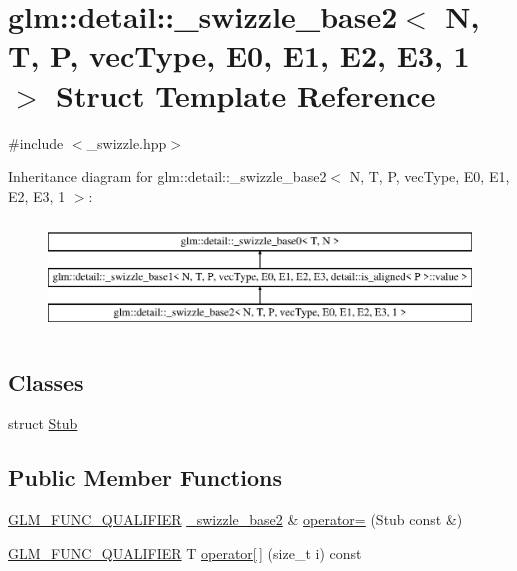 \hypertarget{structglm_1_1detail_1_1__swizzle__base2_3_01_n_00_01_t_00_01_p_00_01vec_type_00_01_e0_00_01_e1_00_01_e2_00_01_e3_00_011_01_4}{}\section{glm\+::detail\+::\+\_\+swizzle\+\_\+base2$<$ N, T, P, vec\+Type, E0, E1, E2, E3, 1 $>$ Struct Template Reference}
\label{structglm_1_1detail_1_1__swizzle__base2_3_01_n_00_01_t_00_01_p_00_01vec_type_00_01_e0_00_01_e1_00_01_e2_00_01_e3_00_011_01_4}


{\ttfamily \#include $<$\+\_\+swizzle.\+hpp$>$}

Inheritance diagram for glm\+::detail\+::\+\_\+swizzle\+\_\+base2$<$ N, T, P, vec\+Type, E0, E1, E2, E3, 1 $>$\+:\begin{figure}[H]
\begin{center}
\leavevmode
\includegraphics[height=3.000000cm]{structglm_1_1detail_1_1__swizzle__base2_3_01_n_00_01_t_00_01_p_00_01vec_type_00_01_e0_00_01_e1_00_01_e2_00_01_e3_00_011_01_4}
\end{center}
\end{figure}
\subsection*{Classes}
\begin{DoxyCompactItemize}
\item 
struct \mbox{\hyperlink{structglm_1_1detail_1_1__swizzle__base2_3_01_n_00_01_t_00_01_p_00_01vec_type_00_01_e0_00_01_e1_031fe02025030ffc83445bf43c5297f64}{Stub}}
\end{DoxyCompactItemize}
\subsection*{Public Member Functions}
\begin{DoxyCompactItemize}
\item 
\mbox{\hyperlink{setup_8hpp_a33fdea6f91c5f834105f7415e2a64407}{G\+L\+M\+\_\+\+F\+U\+N\+C\+\_\+\+Q\+U\+A\+L\+I\+F\+I\+ER}} \mbox{\hyperlink{structglm_1_1detail_1_1__swizzle__base2}{\+\_\+swizzle\+\_\+base2}} \& \mbox{\hyperlink{structglm_1_1detail_1_1__swizzle__base2_3_01_n_00_01_t_00_01_p_00_01vec_type_00_01_e0_00_01_e1_00_01_e2_00_01_e3_00_011_01_4_aefe588f8e3fc72f6be6350ba9524ae93}{operator=}} (Stub const \&)
\item 
\mbox{\hyperlink{setup_8hpp_a33fdea6f91c5f834105f7415e2a64407}{G\+L\+M\+\_\+\+F\+U\+N\+C\+\_\+\+Q\+U\+A\+L\+I\+F\+I\+ER}} T \mbox{\hyperlink{structglm_1_1detail_1_1__swizzle__base2_3_01_n_00_01_t_00_01_p_00_01vec_type_00_01_e0_00_01_e1_00_01_e2_00_01_e3_00_011_01_4_ad3ffb03de9a95ef467776571f51d40e7}{operator\mbox{[}$\,$\mbox{]}}} (size\+\_\+t i) const
\end{DoxyCompactItemize}
